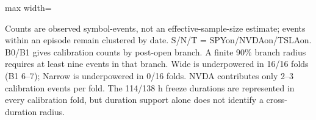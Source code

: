 \begin{table}[!ht]
\begin{adjustbox}{max width=\linewidth}
\end{adjustbox}
\vspace{0.5em}
\par\noindent\begin{minipage}{\linewidth}\raggedright{\scriptsize Counts are observed symbol-events, not an effective-sample-size estimate; events within an episode remain clustered by date. S/N/T = SPYon/NVDAon/TSLAon. B0/B1 gives calibration counts by post-open branch. A finite 90\% branch radius requires at least nine events in that branch. Wide is underpowered in 16/16 folds (B1 6--7); Narrow is underpowered in 0/16 folds. NVDA contributes only 2--3 calibration events per fold. The 114/138 h freeze durations are represented in every calibration fold, but duration support alone does not identify a cross-duration radius.}\end{minipage}\par

\end{table}
